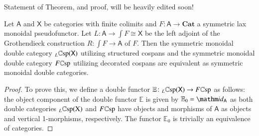 \documentclass{amsart}
\begin{document}
{\chris Statement of Theorem, and proof, will be heavily edited soon!}
\begin{thm}\label{Equiv}
Let $\mathsf{A}$ and $\mathsf{X}$ be categories with finite colimits and $F \colon \mathsf{A} \to \mathbf{Cat}$ a symmetric lax monoidal pseudofunctor. Let $L \colon \mathsf{A} \to \int{F} \cong \mathsf{X}$ be the left adjoint of the Grothendieck construction $R \colon \int{F} \to \mathsf{A}$ of $F$. Then the symmetric monoidal double category $_L \mathbb{C}\textnormal{sp}(\mathsf{X})$ utilizing structured cospans and the symmetric monoidal double category $F\mathbb{C}\textnormal{sp}$ utilizing decorated cospans are equivalent as symmetric monoidal double categories.
\end{thm}
\begin{proof}
To prove this, we define a double functor $\mathbb{E} \colon _L \mathbb{C}\textnormal{sp}(\mathsf{X}) \to F\mathbb{C}\textnormal{sp}$ as follows: the object component of the double functor $\mathbb{E}$ is given by $\mathbb{E}_0 = \id_{\mathsf{A}}$ as both double categories $_L \mathbb{C}\textnormal{sp}(\mathrm{X})$ and $F\mathbb{C}\textnormal{sp}$ have objects and morphisms of $\mathsf{A}$ as objects and vertical 1-morphisms, respectively. The functor $\mathbb{E}_0$ is trivially an equivalence of categories.


\end{proof}
\end{document}
